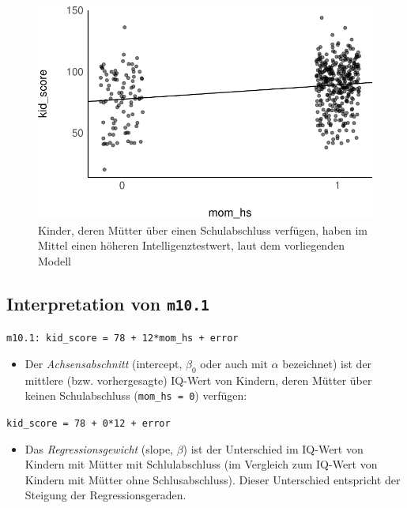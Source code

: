\documentclass[
  a4paper,
  DIV=11]{scrreprt}
\providecommand{\tightlist}{%
  \setlength{\itemsep}{0pt}\setlength{\parskip}{0pt}}\usepackage{longtable,booktabs,array}
\theoremstyle{definition}
\theoremstyle{remark}
\begin{document}
\begin{figure}[H]

{\centering \includegraphics{./metrische-AV_files/figure-pdf/fig-momkid-1.pdf}

}

\caption{\label{fig-momkid}Kinder, deren Mütter über einen
Schulabschluss verfügen, haben im Mittel einen höheren
Intelligenztestwert, laut dem vorliegenden Modell}

\end{figure}

\hypertarget{interpretation-von-m10.1}{%
\subsection{\texorpdfstring{Interpretation von
\texttt{m10.1}}{Interpretation von m10.1}}\label{interpretation-von-m10.1}}

\texttt{m10.1:\ kid\_score\ =\ 78\ +\ 12*mom\_hs\ +\ error}

\begin{itemize}
\tightlist
\item
  Der \emph{Achsensabschnitt} (intercept, \(\beta_0\) oder auch mit
  \(\alpha\) bezeichnet) ist der mittlere (bzw. vorhergesagte) IQ-Wert
  von Kindern, deren Mütter über keinen Schulabschluss
  (\texttt{mom\_hs\ =\ 0}) verfügen:
\end{itemize}

\texttt{kid\_score\ =\ 78\ +\ 0*12\ +\ error}

\begin{itemize}
\tightlist
\item
  Das \emph{Regressionsgewicht} (slope, \(\beta\)) ist der Unterschied
  im IQ-Wert von Kindern mit Mütter mit Schlulabschluss (im Vergleich
  zum IQ-Wert von Kindern mit Mütter ohne Schlusabschluss). Dieser
  Unterschied entspricht der Steigung der Regressionsgeraden.
\end{itemize}
\end{document}
